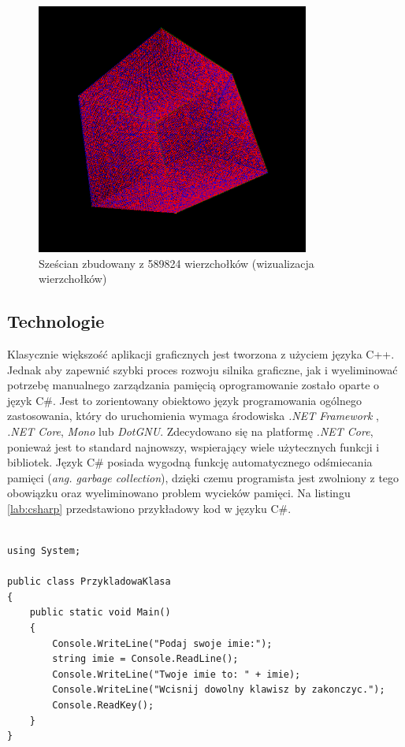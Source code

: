 \documentclass[archive]{mgr}
\begin{document}
\begin{figure}[h!]
  \centering
    \includegraphics[width=0.8\textwidth]{images/points.png}
   \caption{Sześcian zbudowany z 589824 wierzchołków (wizualizacja wierzchołków)}
   \label{lab:points}
\end{figure}
\newpage
 

\subsection{Technologie}

Klasycznie większość aplikacji graficznych jest tworzona z użyciem języka C++. Jednak aby zapewnić szybki proces rozwoju silnika graficzne, jak i wyeliminować potrzebę manualnego zarządzania pamięcią oprogramowanie zostało oparte o język C\#. Jest to zorientowany obiektowo język programowania ogólnego zastosowania, który do uruchomienia wymaga środowiska \emph{.NET Framework} , \emph{.NET Core}, \emph{Mono} lub \emph{DotGNU}. Zdecydowano się na platformę \emph{.NET Core}, ponieważ jest to standard najnowszy, wspierający wiele użytecznych funkcji i bibliotek. Język C\# posiada wygodną funkcję automatycznego odśmiecania pamięci (\emph{ang. garbage collection}), dzięki czemu programista jest zwolniony z tego obowiązku oraz wyeliminowano problem wycieków pamięci. Na listingu  \ref{lab:csharp} przedstawiono przykładowy kod w języku C\#.

\begin{lstlisting}[caption={Przykładowy kod w języku C\#},captionpos=b,label={lab:csharp}]

using System;

public class PrzykladowaKlasa
{
    public static void Main()
    {
        Console.WriteLine("Podaj swoje imie:");
        string imie = Console.ReadLine();
        Console.WriteLine("Twoje imie to: " + imie);
        Console.WriteLine("Wcisnij dowolny klawisz by zakonczyc.");
        Console.ReadKey();
    }
}
\end{lstlisting}
\end{document}
